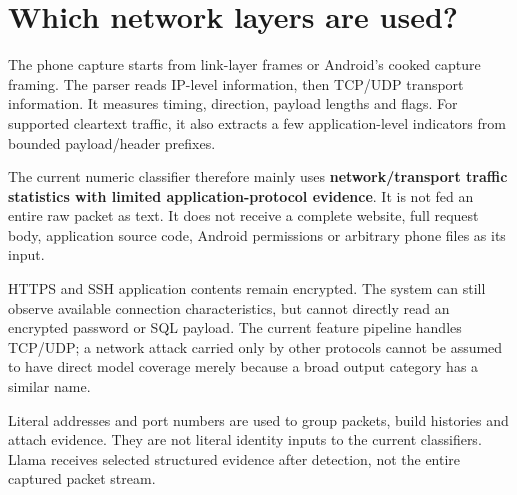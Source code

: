\documentclass[11pt,a4paper,oneside]{report}
\begin{document}
\section{Which network layers are used?}
The phone capture starts from link-layer frames or Android's cooked capture framing. The parser reads IP-level information, then TCP/UDP transport information. It measures timing, direction, payload lengths and flags. For supported cleartext traffic, it also extracts a few application-level indicators from bounded payload/header prefixes.

The current numeric classifier therefore mainly uses \textbf{network/transport traffic statistics with limited application-protocol evidence}. It is not fed an entire raw packet as text. It does not receive a complete website, full request body, application source code, Android permissions or arbitrary phone files as its input.

HTTPS and SSH application contents remain encrypted. The system can still observe available connection characteristics, but cannot directly read an encrypted password or SQL payload. The current feature pipeline handles TCP/UDP; a network attack carried only by other protocols cannot be assumed to have direct model coverage merely because a broad output category has a similar name.

Literal addresses and port numbers are used to group packets, build histories and attach evidence. They are not literal identity inputs to the current classifiers. Llama receives selected structured evidence after detection, not the entire captured packet stream.
\end{document}
